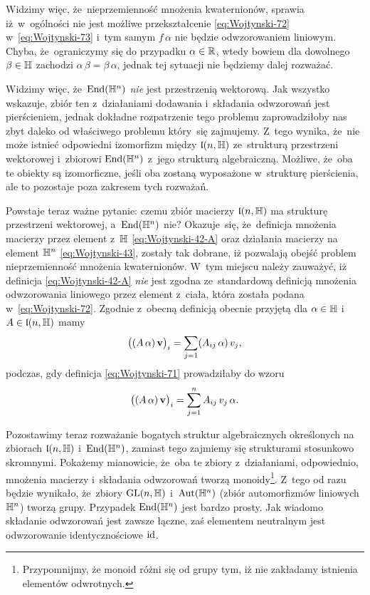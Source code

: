 \documentclass[a4paper,11pt]{article}
\begin{document}
Widzimy więc, że~nieprzemienność mnożenia kwaternionów, sprawia
iż~w~ogólności nie jest możliwe przekształcenie \eqref{eq:Wojtynski-72}
w~\eqref{eq:Wojtynski-73} i~tym samym $f \, \alpha$ nie będzie odwzorowaniem
liniowym. Chyba, że~ograniczymy się do przypadku $\alpha \in \mathbb{R}$, wtedy bowiem
dla dowolnego $\beta \in \mathbb{H}$ zachodzi $\alpha \, \beta = \beta \, \alpha$, jednak tej sytuacji nie będziemy dalej rozważać.

Widzimy więc, że~$\mathrm{End}( \mathbb{H}^{ n } )$ \textit{nie} jest przestrzenią
wektorową. Jak wszystko wskazuje, zbiór ten z~działaniami dodawania i~składania odwzorowań jest pierścieniem, jednak dokładne rozpatrzenie tego problemu zaprowadziłoby nas zbyt daleko od właściwego problemu który~się
zajmujemy. Z~tego wynika, że~nie może istnieć odpowiedni izomorfizm między
$\mathfrak{l}( n, \mathbb{H} )$ ze~strukturą przestrzeni wektorowej
i~zbiorowi $\mathrm{End}( \mathbb{H}^{ n } )$ z~jego strukturą algebraiczną. Możliwe,
że~oba te obiekty są izomorficzne, jeśli oba zostaną wyposażone w~strukturę
pierścienia, ale to pozostaje poza zakresem tych rozważań.

Powstaje teraz ważne pytanie: czemu zbiór macierzy $\mathfrak{l}( n, \mathbb{H} )$ ma strukturę przestrzeni wektorowej, a~$\mathrm{End}( \mathbb{H}^{ n } )$ nie? Okazuje~się,
że~definicja mnożenia macierzy przez element z~$\mathbb{H}$ \eqref{eq:Wojtynski-42-A} oraz działania macierzy na element $\mathbb{H}^{ n }$ \eqref{eq:Wojtynski-43}, zostały tak dobrane, iż pozwalają obejść problem
nieprzemienność mnożenia kwaternionów. W~tym miejscu należy zauważyć, iż definicja \eqref{eq:Wojtynski-42-A} \textit{nie} jest zgodna ze~standardową definicją mnożenia odwzorowania liniowego przez element z~ciała, która została podana w~\eqref{eq:Wojtynski-72}. Zgodnie z~obecną definicją obecnie przyjętą dla $\alpha \in \mathbb{H}$ i~$A \in \mathfrak{l}( n, \mathbb{H} )$ mamy
\begin{equation}
  \label{eq:Wojtynski-77}
  \big( ( A \, \alpha ) \, \mathbf{v} \big)_{ i } =
  \sum_{ j = 1 } ( A_{ i j } \, \alpha ) \, v_{ j },
\end{equation}
podczas, gdy definicja \eqref{eq:Wojtynski-71} prowadziłaby do wzoru
\begin{equation}
  \label{eq:Wojtynsk-78}
  \big( ( A \, \alpha ) \, \mathbf{v} \big)_{ i } =
  \sum_{ j = 1 }^{ n } A_{ i j } \, v_{ j } \, \alpha.
\end{equation}

Pozostawimy teraz rozważanie bogatych struktur algebraicznych określonych
na zbiorach $\mathfrak{l}( n, \mathbb{H} )$ i~$\mathrm{End}( \mathbb{H}^{ n } )$, zamiast tego
zajmiemy się strukturami stosunkowo skromnymi. Pokażemy mianowicie, że~oba te
zbiory z~działaniami, odpowiednio, mnożenia macierzy i~składania odwzorowań
tworzą monoidy\footnote{Przypomnijmy, że monoid różni się od grupy tym, iż
  nie zakładamy istnienia elementów odwrotnych.}. Z~tego od razu będzie
wynikało, że~zbiory $\mathrm{GL}( n, \mathbb{H} )$ i~$\mathrm{Aut}( \mathbb{H}^{ n } )$ (zbiór
automorfizmów liniowych $\mathbb{H}^{ n }$) tworzą grupy. Przypadek $\mathrm{End}( \mathbb{H}^{ n } )$ jest bardzo prosty. Jak wiadomo składanie odwzorowań jest zawsze łączne, zaś elementem neutralnym jest odwzorowanie identycznościowe $\mathrm{id}$.
\end{document}
